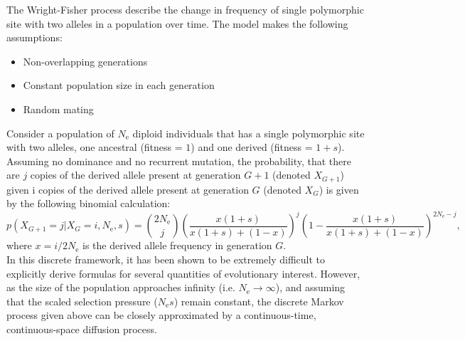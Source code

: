 \documentclass{article}
\newcommand{\e}{\mathrm{e}}
\newcommand{\Ne}{N_\e}
\begin{document}
The Wright-Fisher process describe the change in frequency of single polymorphic site with two alleles in a population over time.
The model makes the following assumptions:
\begin{itemize}
	\setlength\itemsep{-0.2em}
	\item Non-overlapping generations
	\item Constant population size in each generation
	\item Random mating
\end{itemize}
Consider a population of $\Ne$ diploid individuals that has a single polymorphic site with two alleles, one ancestral (fitness = $1$) and one derived (fitness = $1+s$).
Assuming no dominance and no recurrent mutation, the probability, that there are $j$ copies of the derived allele present at generation $G+1$ (denoted $X_{G+1}$) given i copies of the derived allele present at generation $G$ (denoted $X_{G}$) is given by the following binomial calculation:
\begin{equation}
	p\left( X_{G+1} = j |X_{G} = i, \Ne, s \right)  =  \binom{2 \Ne}{j} \left( \dfrac{x(1+s)}{x(1+s) + (1-x)} \right)^j \left(1 - \dfrac{x(1+s)}{x(1+s) + (1-x)} \right)^{2 \Ne -j}, 
\end{equation}
where $x = i / 2 \Ne$ is the derived allele frequency in generation $G$.\\

In this discrete framework, it has been shown to be extremely difficult to explicitly derive formulas for several quantities of evolutionary interest.
However, as the size of the population approaches infinity (i.e.
$ \Ne \rightarrow \infty$), and assuming that the scaled selection pressure ($\Ne s $) remain constant, the discrete Markov process given above can be closely approximated by a continuous-time, continuous-space diffusion process.\\
\end{document}
